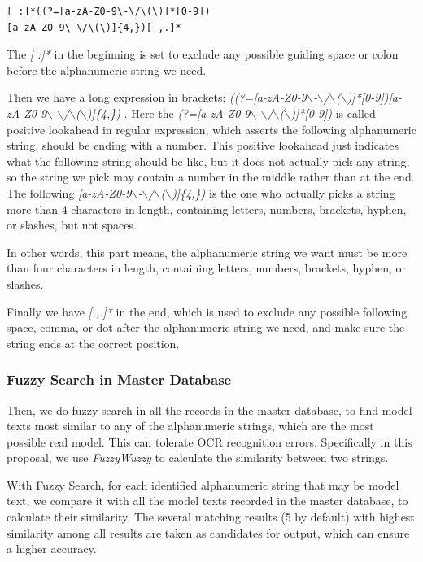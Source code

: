 \documentclass[technicalreport]{ieicej}
\begin{document}
            \begin{center}
            \begin{BVerbatim}
[ :]*((?=[a-zA-Z0-9\-\/\(\)]*[0-9])
[a-zA-Z0-9\-\/\(\)]{4,})[ ,.]*
            \end{BVerbatim}
            \end{center}
    
            The {\em [ :]*} in the beginning is set to exclude any possible guiding space or colon before the alphanumeric string we need.

            Then we have a long expression in brackets: {\em ((?=[a-zA-Z0-9$\backslash$-$\backslash$/$\backslash$($\backslash$)]*[0-9])[a-zA-Z0-9$\backslash$-$\backslash$/$\backslash$($\backslash$)]\{4,\}) }. Here the {\em (?=[a-zA-Z0-9$\backslash$-$\backslash$/$\backslash$($\backslash$)]*[0-9])} is called positive lookahead in regular expression, which asserts the following alphanumeric string, should be ending with a number. This positive lookahead just indicates what the following string should be like, but it does not actually pick any string, so the string we pick may contain a number in the middle rather than at the end. The following {\em [a-zA-Z0-9$\backslash$-$\backslash$/$\backslash$($\backslash$)]\{4,\})} is the one who actually picks a string more than 4 characters in length, containing letters, numbers, brackets, hyphen, or slashes, but not spaces.

            In other words, this part means, the alphanumeric string we want must be more than four characters in length, containing letters, numbers, brackets, hyphen, or slashes.

            Finally we have {\em [ ,.]*} in the end, which is used to exclude any possible following space, comma, or dot after the alphanumeric string we need, and make sure the string ends at the correct position.


        \subsubsection{Fuzzy Search in Master Database}
            Then, we do fuzzy search in all the records in the master database, to find model texts most similar to any of the alphanumeric strings, which are the most possible real model. This can tolerate OCR recognition errors. Specifically in this proposal, we use {\em FuzzyWuzzy} to calculate the similarity between two strings.
            
            With Fuzzy Search, for each identified alphanumeric string that may be model text, we compare it with all the model texts recorded in the master database, to calculate their similarity. The several matching results (5 by default) with highest similarity among all results are taken as candidates for output, which can ensure a higher accuracy.
\end{document}
